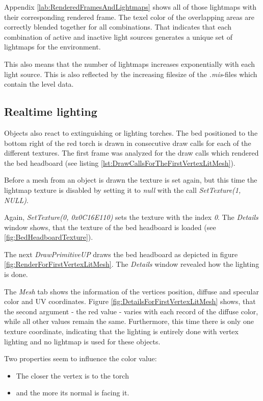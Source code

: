 Appendix \ref{lab:RenderedFramesAndLightmaps} shows all of those lightmaps with their corresponding rendered frame. The texel color of the overlapping areas are correctly blended together for all combinations. That indicates that each combination of active and inactive light sources generates a unique set of lightmaps for the environment.

This also means that the number of lightmaps increases exponentially with each light source. This is also reflected by the increasing filesize of the \textit{.mis}-files which contain the level data.

\subsection{Realtime lighting}

Objects also react to extinguishing or lighting torches. The bed positioned to the bottom right of the red torch is drawn in consecutive draw calls for each of the different textures. The first frame was analyzed for the draw calls which rendered the bed headboard (see listing \ref{lst:DrawCallsForTheFirstVertexLitMesh}).

Before a mesh from an object is drawn the texture is set again, but this time the lightmap texture is disabled by setting it to \textit{null} with the call \textit{SetTexture(1, NULL)}.

Again, \textit{SetTexture(0, 0x0C16E110)} sets the texture with the index \textit{0}. The \textit{Details} window shows, that the texture of the bed headboard is loaded (see \ref{fig:BedHeadboardTexture}).

 
The next \textit{DrawPrimitiveUP} draws the bed headboard as depicted in figure \ref{fig:RenderForFirstVertexLitMesh}.
The \textit{Details} window revealed how the lighting is done.

The \textit{Mesh} tab shows the information of the vertices position, diffuse and specular color and UV coordinates. Figure \ref{fig:DetailsForFirstVertexLitMesh} shows, that the second argument - the red value - varies with each record of the diffuse color, while all other values remain the same. Furthermore, this time there is only one texture coordinate, indicating that the lighting is entirely done with vertex lighting and no lightmap is used for these objects.

Two properties seem to influence the color value: 

\begin{itemize}
  \item The closer the vertex is to the torch
  \item and the more its normal is facing it.
\end{itemize}



